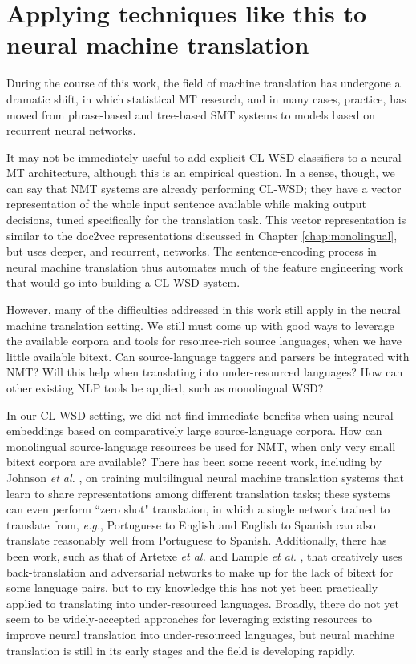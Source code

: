 \section{Applying techniques like this to neural machine translation}
During the course of this work, the field of machine translation has undergone
a dramatic shift, in which statistical MT research, and in many cases,
practice\cite{gnmt}, has moved from phrase-based and tree-based SMT systems to
models based on recurrent neural networks.

It may not be immediately useful to add explicit CL-WSD classifiers to a neural
MT architecture, although this is an empirical question. In a sense, though, we
can say that NMT systems are already performing CL-WSD; they have a vector
representation of the whole input sentence available while making output
decisions, tuned specifically for the translation task. This vector
representation is similar to the doc2vec representations discussed in Chapter
\ref{chap:monolingual}, but uses deeper, and recurrent, networks. The
sentence-encoding process in neural machine translation thus automates much of
the feature engineering work that would go into building a CL-WSD system.

However, many of the difficulties addressed in this work still apply in the
neural machine translation setting. We still must come up with good ways to
leverage the available corpora and tools for resource-rich source languages,
when we have little available bitext. Can source-language taggers and parsers
be integrated with NMT? Will this help when translating into under-resourced
languages? How can other existing NLP tools be applied, such as monolingual
WSD?

In our CL-WSD setting, we did not find immediate benefits when using neural
embeddings based on comparatively large source-language corpora. How can
monolingual source-language resources be used for NMT, when only very small
bitext corpora are available?  There has been some recent work, including by
Johnson \emph{et al.} \cite{TACL1081}, on training multilingual neural machine
translation systems that learn to share representations among different
translation tasks; these systems can even perform ``zero shot" translation, in
which a single network trained to translate from, \emph{e.g.}, Portuguese to
English and English to Spanish can also translate reasonably well from
Portuguese to Spanish.
Additionally, there has been work, such as that of Artetxe \emph{et al.}
\cite{artetxe2018unsupervised} and Lample \emph{et al.}
\cite{lample2018unsupervised}, that creatively uses back-translation and
adversarial networks to make up for the lack of bitext for some language pairs,
but to my knowledge this has not yet been practically applied to translating
into under-resourced languages.  Broadly, there do not yet seem to be
widely-accepted approaches for leveraging existing resources to improve neural
translation into under-resourced languages, but neural machine translation is
still in its early stages and the field is developing rapidly.


